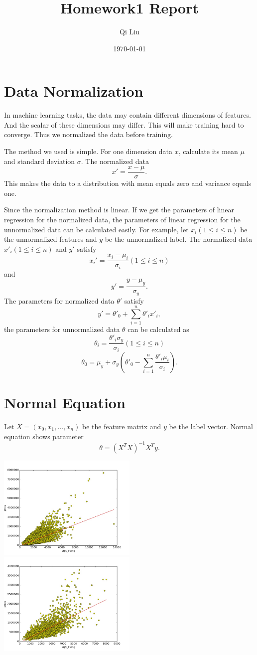 \documentclass{article}
\title{Homework1 Report}
\author{Qi Liu}
\date{\today}
\begin{document}
\maketitle

\section{Data Normalization}
In machine learning tasks, the data may contain different dimensions of features. And the scalar of these dimensions may differ. This will make training hard to converge. Thus we normalized the data before training.

The method we used is simple. For one dimension data $x$, calculate its mean $\mu$ and standard deviation $\sigma$. The normalized data $$x'=\frac{x-\mu}{\sigma}.$$ This makes the data to a distribution with mean equals zero and variance equals one.

Since the normalization method is linear. If we get the parameters of linear regression for the normalized data, the parameters of linear regression for the unnormalized data can be calculated easily. For example, let $x_i(1\le i\le n)$ be the unnormalized features and $y$ be the unnormalized label. The normalized data $x'_i(1\le i\le n)$ and $y'$ satisfy $$x_i'=\frac{x_i-\mu_i}{\sigma_i}(1\le i\le n)$$ and $$y'=\frac{y-\mu_y}{\sigma_y}.$$ The parameters for normalized data $\theta'$ satisfy $$y'=\theta'_0+\sum_{i=1}^n\theta'_ix'_i,$$ the parameters for unnormalized data $\theta$ can be calculated as $$\theta_i=\frac{\theta'_i\sigma_y}{\sigma_i}(1\le i\le n)$$ $$\theta_0=\mu_y+\sigma_y (\theta'_0-\sum_{i=1}^n\frac{\theta'_i\mu_i}{\sigma_i}).$$

\section{Normal Equation}
Let $X=(x_0,x_1,\ldots,x_n)$ be the feature matrix and $y$ be the label vector. Normal equation shows parameter $$\theta=(X^TX)^{-1}X^Ty.$$

\includegraphics[width=0.5\textwidth]{../result/required_train_normal_equation.jpg}
\includegraphics[width=0.5\textwidth]{../result/required_test_normal_equation.jpg}
\end{document}
